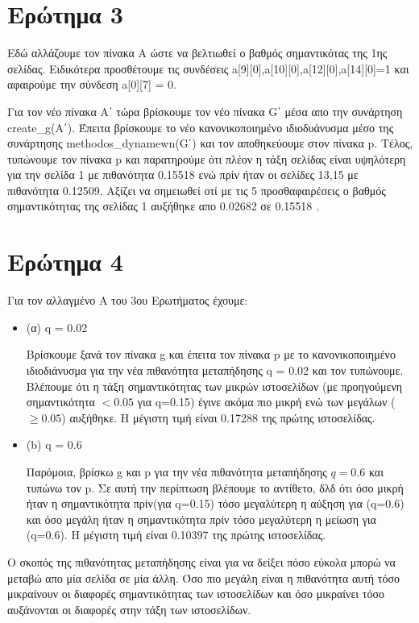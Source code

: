 \documentclass{article}
\begin{document}
    \section{Ερώτημα 3}
    
    Εδώ αλλάζουμε τον πίνακα Α ώστε να βελτιωθεί ο βαθμός σημαντικότας της 1ης σελίδας. Ειδικότερα προσθέτουμε τις συνδέσεις a[9][0],a[10][0],a[12][0],a[14][0]=1 και αφαιρούμε την σύνδεση a[0][7] = 0.
    
    Για τον νέο πίνακα Α΄ τώρα βρίσκουμε τον νέο πίνακα G΄ 
    μέσα απο την συνάρτηση create\_g(A΄). 
    Έπειτα βρίσκουμε το νέο κανονικοποιημένο ιδιοδυάνυσμα μέσο της συνάρτησης methodos\_dynamewn(G΄) και τον αποθηκεύουμε στον πίνακα p.
    Τέλος, τυπώνουμε τον πίνακα p και παρατηρούμε ότι πλέον η τάξη σελίδας είναι υψηλότερη για την σελίδα 1 με πιθανότητα 0.15518 ενώ πρίν ήταν οι σελίδες 13,15 με πιθανότητα 0.12509. 
    Αξίζει να σημειωθεί οτί με τις 5 προσθαφαιρέσεις ο βαθμός σημαντικότητας της σελίδας 1 αυξήθηκε απο 0.02682 σε 0.15518 .
        
    \section{Ερώτημα 4}
   Για τον αλλαγμένο Α του 3ου Ερωτήματος έχουμε:
    \begin{itemize}
        \item (α) q = 0.02
        
        Βρίσκουμε ξανά τον πίνακα g και έπειτα τον πίνακα p με το κανονικοποιημένο ιδιοδιάνυσμα για την νέα πιθανότητα μεταπήδησης q = 0.02 και τον τυπώνουμε.
        Βλέπουμε ότι η τάξη σημαντικότητας των μικρών ιστοσελίδων (με προηγούμενη σημαντικότητα $<0.05$ για q=0.15) έγινε ακόμα πιο μικρή ενώ των μεγάλων ($\geq0.05$) αυξήθηκε. Η μέγιστη τιμή είναι 0.17288 της πρώτης ιστοσελίδας.
        \item (b) q = 0.6 
        
        Παρόμοια, βρίσκω g και p για την νέα πιθανότητα μεταπήδησης $q = 0.6$ και τυπώνω τον p.
        Σε αυτή την περίπτωση βλέπουμε το αντίθετο, δλδ ότι όσο μικρή ήταν η σημαντικότητα πρίν(για q=0.15) τόσο μεγαλύτερη η αύξηση για (q=0.6) και όσο μεγάλη ήταν η σημαντικότητα πρίν τόσο μεγαλύτερη η μείωση για (q=0.6). Η μέγιστη τιμή είναι 0.10397 της πρώτης ιστοσελίδας.
    \end{itemize}
    Ο σκοπός της πιθανότητας μεταπήδησης είναι για να δείξει πόσο εύκολα μπορώ να μεταβώ απο μία σελίδα σε μία
    άλλη. Όσο πιο μεγάλη είναι η πιθανότητα αυτή τόσο μικραίνουν οι διαφορές σημαντικότητας των ιστοσελίδων
    και όσο μικραίνει τόσο αυξάνονται οι διαφορές στην τάξη των ιστοσελίδων.
    
\end{document}
